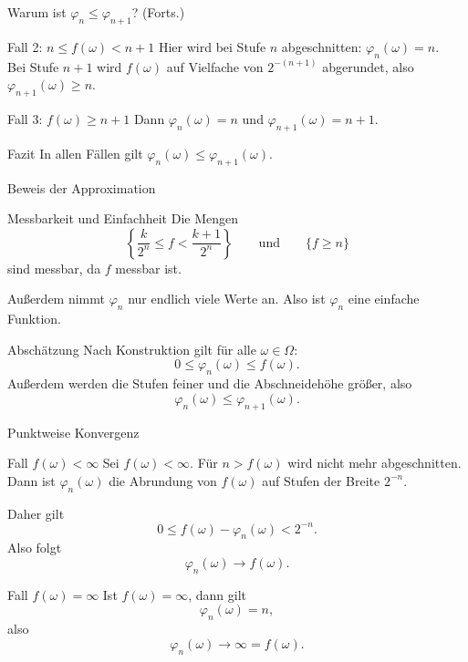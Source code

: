 \documentclass{beamer}
\begin{document}
\begin{frame}{Warum ist \(\varphi_n\le\varphi_{n+1}\)? (Forts.)}
\begin{block}{Fall 2: \(n\le f(\omega)<n+1\)}
Hier wird bei Stufe \(n\) abgeschnitten: \(\varphi_n(\omega)=n\).
\\
Bei Stufe \(n+1\) wird \(f(\omega)\) auf Vielfache von \(2^{-(n+1)}\) abgerundet, also \(\varphi_{n+1}(\omega)\ge n\).
\end{block}

\begin{block}{Fall 3: \(f(\omega)\ge n+1\)}
Dann \(\varphi_n(\omega)=n\) und \(\varphi_{n+1}(\omega)=n+1\).
\end{block}

\begin{block}{Fazit}
In allen Fällen gilt \(\varphi_n(\omega)\le \varphi_{n+1}(\omega)\).
\end{block}
\end{frame}

\begin{frame}[shrink=5]{Beweis der Approximation}
\begin{block}{Messbarkeit und Einfachheit}
Die Mengen
\[
\left\{
\frac{k}{2^n}\le f<\frac{k+1}{2^n}
\right\}
\qquad\text{und}\qquad
\{f\ge n\}
\]
sind messbar, da \(f\) messbar ist.

Außerdem nimmt \(\varphi_n\) nur endlich viele Werte an. Also ist \(\varphi_n\) eine einfache Funktion.
\end{block}

\begin{block}{Abschätzung}
Nach Konstruktion gilt für alle \(\omega\in\Omega\):
\[
0\le \varphi_n(\omega)\le f(\omega).
\]
Außerdem werden die Stufen feiner und die Abschneidehöhe größer, also
\[
\varphi_n(\omega)\le \varphi_{n+1}(\omega).
\]
\end{block}
\end{frame}

\begin{frame}{Punktweise Konvergenz}
\begin{block}{Fall \(f(\omega)<\infty\)}
Sei \(f(\omega)<\infty\). Für \(n>f(\omega)\) wird nicht mehr abgeschnitten.
Dann ist \(\varphi_n(\omega)\) die Abrundung von \(f(\omega)\) auf Stufen der Breite \(2^{-n}\).

Daher gilt
\[
0\le f(\omega)-\varphi_n(\omega)<2^{-n}.
\]
Also folgt
\[
\varphi_n(\omega)\to f(\omega).
\]
\end{block}

\begin{block}{Fall \(f(\omega)=\infty\)}
Ist \(f(\omega)=\infty\), dann gilt
\[
\varphi_n(\omega)=n,
\]
also
\[
\varphi_n(\omega)\to\infty=f(\omega).
\]
\end{block}
\end{frame}
\end{document}
